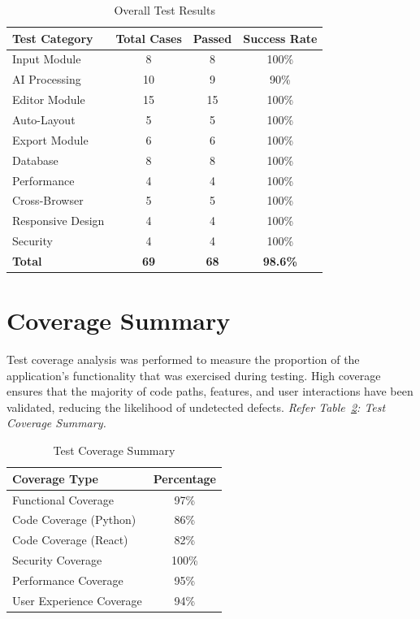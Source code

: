 \begin{table}[!htbp]
\centering
\small
\renewcommand{\arraystretch}{1.3}
\begin{tabular}{|p{4cm}|c|c|c|}
    \hline
    \textbf{Test Category} & \textbf{Total Cases} & 
    \textbf{Passed} & \textbf{Success Rate} \\
    \hline
    Input Module & 8 & 8 & 100\% \\
    \hline
    AI Processing & 10 & 9 & 90\% \\
    \hline
    Editor Module & 15 & 15 & 100\% \\
    \hline
    Auto-Layout & 5 & 5 & 100\% \\
    \hline
    Export Module & 6 & 6 & 100\% \\
    \hline
    Database & 8 & 8 & 100\% \\
    \hline
    Performance & 4 & 4 & 100\% \\
    \hline
    Cross-Browser & 5 & 5 & 100\% \\
    \hline
    Responsive Design & 4 & 4 & 100\% \\
    \hline
    Security & 4 & 4 & 100\% \\
    \hline
    \textbf{Total} & \textbf{69} & \textbf{68} & 
    \textbf{98.6\%} \\
    \hline
\end{tabular}
\caption{Overall Test Results}
\label{tab:test-summary}
\end{table}


\section{Coverage Summary}
\label{sec:coverage-summary}

Test coverage analysis was performed to measure the proportion 
of the application's functionality that was exercised during 
testing. High coverage ensures that the majority of code paths, 
features, and user interactions have been validated, reducing 
the likelihood of undetected defects. \textit{Refer Table~\ref{tab:coverage}: Test Coverage Summary.}

\begin{table}[!htbp]
\centering
\small
\renewcommand{\arraystretch}{1.3}
\begin{tabular}{|p{6cm}|c|}
    \hline
    \textbf{Coverage Type} & \textbf{Percentage} \\
    \hline
    Functional Coverage & 97\% \\
    \hline
    Code Coverage (Python) & 86\% \\
    \hline
    Code Coverage (React) & 82\% \\
    \hline
    Security Coverage & 100\% \\
    \hline
    Performance Coverage & 95\% \\
    \hline
    User Experience Coverage & 94\% \\
    \hline
\end{tabular}
\caption{Test Coverage Summary}
\label{tab:coverage}
\end{table}

